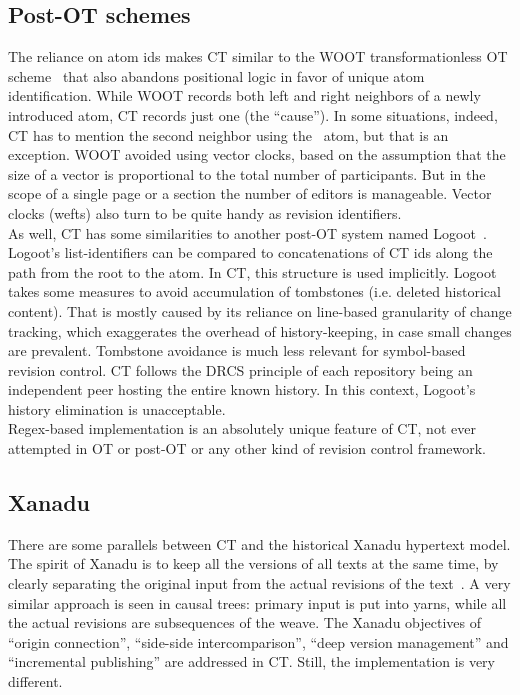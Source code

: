 \documentclass{sig-alternate}
\begin{document}
\subsection{Post-OT schemes}
The reliance on atom ids makes CT similar to the WOOT transformationless OT scheme~\cite{woot} that also abandons positional logic in favor of unique atom identification.
While WOOT records both left and right neighbors of a newly introduced atom, CT records just one (the ``cause''). 
In some situations, indeed, CT has to mention the second neighbor using the \zero ~atom, but that is an exception.
WOOT avoided using vector clocks, based on the assumption that the size of a vector is proportional to the total number of participants.
But in the scope of a single page or a section the number of editors is manageable. Vector clocks (wefts) also turn to be quite handy as revision identifiers. \\
As well, CT has some similarities to another post-OT system named Logoot~\cite{logoot}.
Logoot's list-identifiers can be compared to concatenations of CT ids along the path from the root to the atom.
In CT, this structure is used implicitly.
Logoot takes some measures to avoid accumulation of tombstones (i.e. deleted historical content). That is mostly caused by its reliance on line-based granularity of change tracking, which exaggerates the overhead of history-keeping, in case small changes are prevalent.
Tombstone avoidance is much less relevant for symbol-based revision control.
CT follows the DRCS principle of each repository being an independent peer hosting the entire known history.
In this context, Logoot's history elimination is unacceptable. \\
Regex-based implementation is an absolutely unique feature of CT, not ever attempted in OT or post-OT or any other kind of revision control framework.

\subsection{Xanadu}

There are some parallels between CT and the historical Xanadu hypertext model.
The spirit of Xanadu is to keep all the versions of all texts at the same time, by clearly separating the original input from the actual revisions of the text~\cite{xanacarpet}.
A very similar  approach is seen in causal trees: primary input is put into yarns, while all the actual revisions are subsequences of the weave.
The Xanadu objectives of ``origin connection'', ``side-side intercomparison'', ``deep version management'' and ``incremental publishing'' are addressed in CT.
Still, the implementation is very different.
\end{document}
